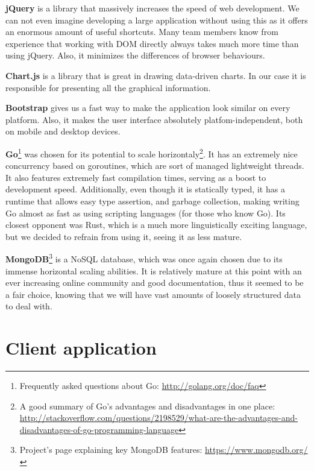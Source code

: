 \documentclass{l3proj}
\begin{document}
\textbf{jQuery} is a library that massively increases the speed of web development. We can not even imagine developing a large application without using this as it offers an enormous amount of useful shortcuts. Many team members know from experience that working with DOM directly always takes much more time than using jQuery. Also, it minimizes the differences of browser behaviours.

\textbf{Chart.js} is a library that is great in drawing data-driven charts. In our case it is responsible for presenting all the graphical information.

\textbf{Bootstrap} gives us a fast way to make the application look similar on every platform. Also, it makes the user interface absolutely platfom-independent, both on mobile and desktop devices.

\textbf{Go}\footnote{\raggedright{}Frequently asked questions about Go: \url{http://golang.org/doc/faq}} was chosen for its potential to scale horizontaly\footnote{\raggedright{}A good summary of Go's advantages and disadvantages in one place: \url{http://stackoverflow.com/questions/2198529/what-are-the-advantages-and-disadvantages-of-go-programming-language}}. It has an extremely nice concurrency based on goroutines, which are sort of managed lightweight threads. It also features extremely fast compilation times, serving as a boost to development speed. Additionally, even though it is statically typed, it has a runtime that allows easy type assertion, and garbage collection, making writing Go almost as fast as using scripting languages (for those who know Go). Its closest opponent was Rust, which is a much more linguistically exciting language, but we decided to refrain from using it, seeing it as less mature.

\textbf{MongoDB}\footnote{\raggedright{Project's page explaining key MongoDB features: \url{https://www.mongodb.org/}}} is a NoSQL database, which was once again chosen due to its immense horizontal scaling abilities. It is relatively mature at this point with an ever increasing online community and good documentation, thus it seemed to be a fair choice, knowing that we will have vast amounts of loosely structured data to deal with.


\section{Client application}
\end{document}
